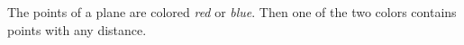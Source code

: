 The points of a plane are colored \emph{red} or \emph{blue}. Then one of the two colors contains points with any distance.
